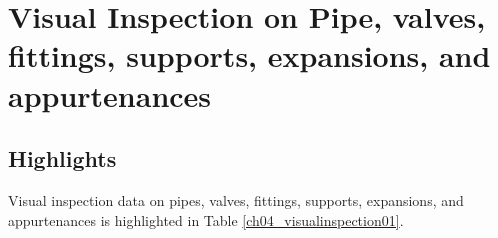 \section{Visual Inspection on Pipe, valves, fittings, supports, expansions, and appurtenances} \label{ch04mech02}

\subsection{Highlights} \label{ch04mech02_highlight}

Visual inspection data on pipes, valves, fittings, supports, expansions, and appurtenances is highlighted in Table \ref{ch04_visualinspection01}.

